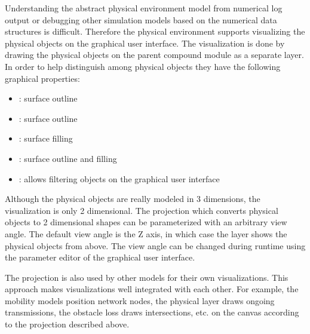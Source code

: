 Understanding the abstract physical environment model from numerical log output
or debugging other simulation models based on the numerical data structures
is difficult. Therefore the physical environment supports visualizing the
physical objects on the graphical user interface. The visualization is done by
drawing the physical objects on the parent compound module as a separate layer. 
In order to help distinguish among physical objects they have the following 
graphical properties:

\begin{itemize}
  \item {}: surface outline 
  \item {}: surface outline
  \item {}: surface filling 
  \item {}: surface outline and filling
  \item {}: allows filtering objects on the graphical user interface
\end{itemize}

Although the physical objects are really modeled in 3 dimensions, the
visualization is only 2 dimensional. The projection which converts physical
objects to 2 dimensional shapes can be parameterized with an arbitrary view
angle. The default view angle is the Z axis, in which case the layer shows the
physical objects from above. The view angle can be changed during runtime using
the parameter editor of the graphical user interface.

The projection is also used by other models for their own visualizations. This
approach makes visualizations well integrated with each other. For example, the
mobility models position network nodes, the physical layer draws ongoing
transmissions, the obstacle loss draws intersections, etc. on the canvas
according to the projection described above. 


